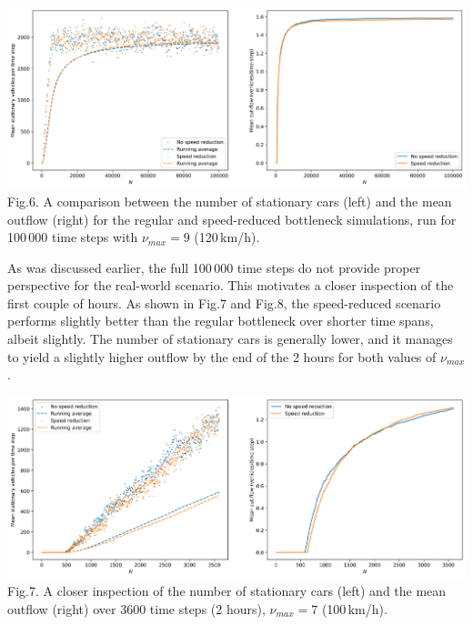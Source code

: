 \documentclass[11pt]{article}
\begin{document}
	\begin{center}
		\includegraphics[scale=0.46]{Figures/Speedlimit_bottleneck_vmax7.png}\\
		Fig.6.	
		A comparison between the number of stationary cars (left) and the mean outflow (right) for the regular and speed-reduced bottleneck simulations, run for 100\,000 time steps with $\nu_{max}=9$ (120\,km/h). \\
	\end{center}

	As was discussed earlier, the full 100\,000 time steps do not provide proper perspective for the real-world scenario. This motivates a closer inspection of the first couple of hours. As shown in Fig.7 and Fig.8, the speed-reduced scenario performs slightly better than the regular bottleneck over shorter time spans, albeit slightly. The number of stationary cars is generally lower, and it manages to yield a slightly higher outflow by the end of the 2 hours for both values of $\nu_{max}$. \\
	
	\begin{center}
		\includegraphics[scale=0.46]{Figures/Speedlimit_bottleneck_vmax7_zoomed.png}\\
		Fig.7.	
		A closer inspection of the number of stationary cars (left) and the mean outflow (right) over 3600 time steps (2 hours), $\nu_{max}=7$ (100\,km/h). \\
	\end{center}
	
\end{document}

